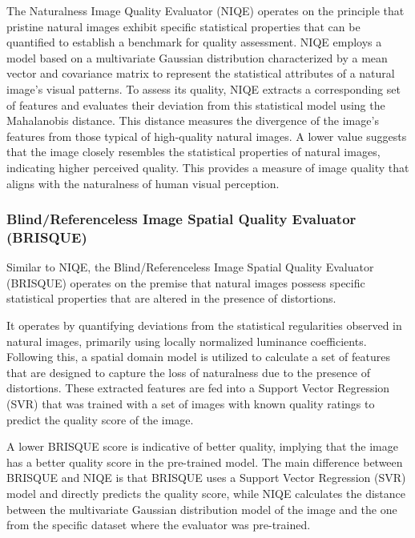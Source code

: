         
            The Naturalness Image Quality Evaluator (NIQE) \cite{niqe} operates on the principle that pristine natural images exhibit specific statistical properties that can be quantified to establish a benchmark for quality assessment. 
            NIQE employs a model based on a multivariate Gaussian distribution characterized by a mean vector and covariance matrix to represent the statistical attributes of a natural image's visual patterns.
            To assess its quality, NIQE extracts a corresponding set of features and evaluates their deviation from this statistical model using the Mahalanobis distance.
            This distance measures the divergence of the image's features from those typical of high-quality natural images.
            A lower value suggests that the image closely resembles the statistical properties of natural images, indicating higher perceived quality. This provides a measure of image quality that aligns with the naturalness of human visual perception. 

        \subsubsection{Blind/Referenceless Image Spatial Quality Evaluator (BRISQUE)}

            Similar to NIQE, the Blind/Referenceless Image Spatial Quality Evaluator (BRISQUE) \cite{mittal2012} operates on the premise that natural images possess specific statistical properties that are altered in the presence of distortions. 
            
            It operates by quantifying deviations from the statistical regularities observed in natural images, primarily using locally normalized luminance coefficients. 
            Following this, a spatial domain model is utilized to calculate a set of features that are designed to capture the loss of naturalness due to the presence of distortions.
            These extracted features are fed into a Support Vector Regression (SVR) that was trained with a set of images with known quality ratings to predict the quality score of the image.
            
            A lower BRISQUE score is indicative of better quality, implying that the image has a better quality score in the pre-trained model. The main difference between BRISQUE and NIQE is that BRISQUE uses a Support Vector Regression (SVR) model and directly predicts the quality score, while NIQE calculates the distance between the multivariate Gaussian distribution model of the image and the one from the specific dataset where the evaluator was pre-trained.




